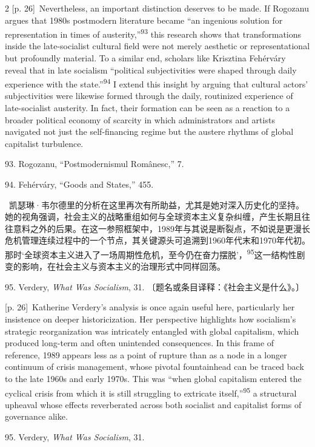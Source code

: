 \documentclass[10pt,a4paper]{article}
\begin{document}
\begin{paracol}{2}
\switchcolumn
{\scriptsize\color{gray} [p. 26]}\ Nevertheless, an important distinction deserves to be made. If Rogozanu argues that 1980s postmodern literature became “an ingenious solution for representation in times of austerity,”\nobreak\textsuperscript{93} this research shows that transformations inside the late-socialist cultural field were not merely aesthetic or representational but profoundly material. To a similar end, scholars like Krisztina Fehérváry reveal that in late socialism “political subjectivities were shaped through daily experience with the state.”\nobreak\textsuperscript{94} I extend this insight by arguing that cultural actors’ subjectivities were likewise formed through the daily, routinized experience of late-socialist austerity. In fact, their formation can be seen as a reaction to a broader political economy of scarcity in which administrators and artists navigated not just the self-financing regime but the austere rhythms of global capitalist turbulence.\par{\small 93. Rogozanu, “Postmodernismul Românesc,” 7.\par}{\small 94. Fehérváry, “Goods and States,” 455.\par}
\switchcolumn*
{\scriptsize\color{gray} [p. 26]}\ 凯瑟琳·韦尔德里的分析在这里再次有所助益，尤其是她对深入历史化的坚持。她的视角强调，社会主义的战略重组如何与全球资本主义复杂纠缠，产生长期且往往意料之外的后果。在这一参照框架中，1989年与其说是断裂点，不如说是更漫长危机管理连续过程中的一个节点，其关键源头可追溯到1960年代末和1970年代初。那时‘全球资本主义进入了一场周期性危机，至今仍在奋力摆脱’，\nobreak\textsuperscript{95}这一结构性剧变的影响，在社会主义与资本主义的治理形式中同样回荡。\par{\small 95. Verdery, \textit{What Was Socialism}, 31. 〔题名或条目译释：《社会主义是什么》。〕\par}
\switchcolumn
{\scriptsize\color{gray} [p. 26]}\ Katherine Verdery’s analysis is once again useful here, particularly her insistence on deeper historicization. Her perspective highlights how socialism’s strategic reorganization was intricately entangled with global capitalism, which produced long-term and often unintended consequences. In this frame of reference, 1989 appears less as a point of rupture than as a node in a longer continuum of crisis management, whose pivotal fountainhead can be traced back to the late 1960s and early 1970s. This was “when global capitalism entered the cyclical crisis from which it is still struggling to extricate itself,”\nobreak\textsuperscript{95} a structural upheaval whose effects reverberated across both socialist and capitalist forms of governance alike.\par{\small 95. Verdery, \textit{What Was Socialism}, 31.\par}

\end{paracol}
\end{document}
